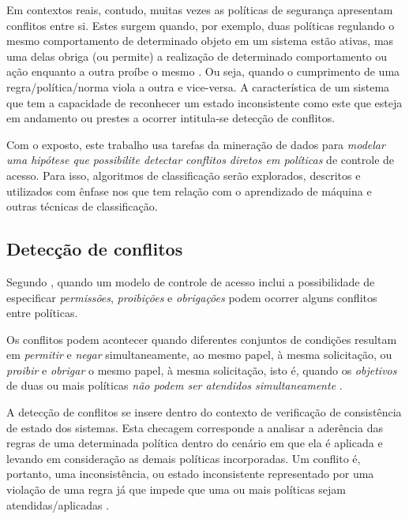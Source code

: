\documentclass[
	12pt,				%
	openright,			%
	oneside,			%
	a4paper,			%
	english,			%
	french,				%
	spanish,			%
	brazil				%
	]{abntex2}
\begin{document}
Em contextos reais, contudo, muitas vezes as políticas de segurança apresentam conflitos entre si. Estes surgem quando, por exemplo, duas políticas regulando o mesmo comportamento de determinado objeto em um sistema estão ativas, mas uma delas obriga (ou permite) a realização de determinado comportamento ou ação enquanto a outra proíbe o mesmo \cite{lupu_conflicts_1999, eduardo2017}. Ou seja, quando o cumprimento de uma regra/política/norma viola a outra e vice-versa. A característica de um sistema que tem a capacidade de reconhecer um estado inconsistente como este que esteja em andamento ou prestes a ocorrer intitula-se detecção de conflitos.

Com o exposto, este trabalho usa tarefas da mineração de dados para \textit{modelar uma hipótese que possibilite detectar conflitos diretos em políticas} de controle de acesso. Para isso, algoritmos de classificação serão explorados, descritos e utilizados com ênfase nos que tem relação com o aprendizado de máquina e outras técnicas de classificação.

\subsection{Detecção de conflitos} \label{deteccao_conflitos}

Segundo , quando um modelo de controle de acesso inclui a possibilidade de especificar \textit{permissões}, \textit{proibições} e \textit{obrigações} podem ocorrer alguns conflitos entre políticas. 

Os conflitos podem acontecer quando diferentes conjuntos de condições resultam em \textit{permitir} e \textit{negar} simultaneamente, ao mesmo papel, à mesma solicitação, ou \textit{proibir} e \textit{obrigar} o mesmo papel, à mesma solicitação, isto é, quando os \textit{objetivos} de duas ou mais políticas \textit{não podem ser atendidos simultaneamente} \cite{cuppens_high_2007}.

A detecção de conflitos se insere dentro do contexto de verificação de consistência de estado dos sistemas. Esta checagem corresponde a analisar a aderência das regras de uma determinada política dentro do cenário em que ela é aplicada e levando em consideração as demais políticas incorporadas. Um conflito é, portanto, uma inconsistência, ou estado inconsistente representado por uma violação de uma regra já que impede que uma ou mais políticas sejam atendidas/aplicadas \cite{ueda_tese_2012}. 
\end{document}
